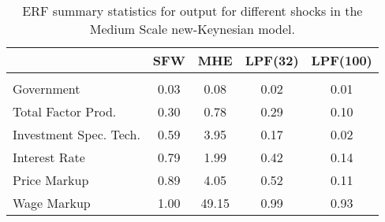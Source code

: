 
\begin{table}[t]
 \centering\tabcolsep=0.2cm
	\small
		\begin{tabular}
		[c]{lcccc}\toprule 
		  & SFW & MHE &  LPF(32) & LPF(100) \\[2pt]
		\hline \hline \\[-4pt]
 		Government             & 0.03 & 0.08 &0.02 &0.01 \\[5pt]    
		Total Factor Prod.   & 0.30 & 0.78  &0.29 &0.10 \\[5pt]
		 Investment Spec. Tech.         & 0.59 & 3.95 &0.17 &0.02 \\[5pt]
		Interest Rate & 0.79 & 1.99 &0.42 &0.14 \\[5pt]
        Price Markup & 0.89 & 4.05 &0.52 &0.11 \\[5pt]
       Wage Markup & 1.00 & 49.15 &0.99 &0.93 \\[2pt]
        
		\bottomrule 
	\end{tabular}



\caption{ERF summary statistics for output for different shocks in the Medium Scale new-Keynesian model.}
\label{tab: main_table_all}
 
\end{table}
